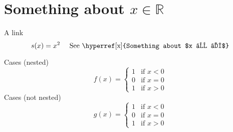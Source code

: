\documentclass{article}
\begin{document}
\section{\label{x}Something about $x ∈ ℝ$}

A link 
\[
  s(x) = x^2 \quad \text{ See \hyperref[x]{Something about $x ∈ ℝ$}}
\]

Cases (nested)
\[
f(x)=
\begin{cases}
  1 & \text{if $x<0$} \\
  0 & \text{if $x=0$} \\
  1 & \text{if $x>0$}          
\end{cases}
\]
Cases (not nested)
\[
g(x)=
\begin{cases}
  1 & \text{if } x<0 \\
  0 & \text{if } x=0 \\
  1 & \text{if } x>0          
\end{cases}
\]
\end{document}
